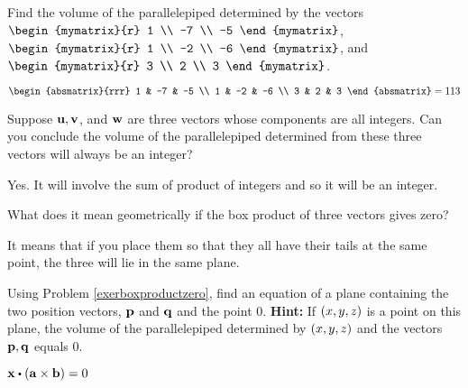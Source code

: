\begin{enumialphparenastyle}

\begin{ex} Find the volume of the parallelepiped determined by the vectors
$\begin{mymatrix}{r}
1 \\
-7 \\
-5
\end{mymatrix} $, \\
 $\begin{mymatrix}{r}
1 \\
-2 \\
-6
\end{mymatrix}$, and $\begin{mymatrix}{r}
3 \\
2 \\
3
\end{mymatrix}$.
\begin{sol}
 $\begin{absmatrix}{rrr}
1 & -7 & -5 \\
1 & -2 & -6 \\
3 & 2 & 3
\end{absmatrix}= 113$
\end{sol}
\end{ex}

\begin{ex} Suppose ${\bf u},{\bf v}$, and ${\bf w}$ are three vectors whose
components are all integers. Can you conclude the volume of the
parallelepiped determined from these three vectors will always be an integer?
\begin{sol}
Yes. It will involve the sum of product of integers and so it will
be an integer.
\end{sol}
\end{ex}

\begin{ex} \label{exerboxproductzero} What does it mean geometrically if the box
product of three vectors gives zero?
\begin{sol}
It means that if you place them so that
they all have their tails at the same point, the three will lie in the same
plane.
\end{sol}
\end{ex}

\begin{ex} Using Problem \ref{exerboxproductzero}, find an equation of a plane
containing the two position vectors, ${\bf p}$ and ${\bf q}$ and the
point $0$. 
\textbf{Hint: }If $\left(x,y,z\right) $ is a point on
this plane, the volume of the parallelepiped determined by $\left(
x,y,z\right) $ and the vectors ${\bf p},{\bf q}$ equals 0.
\begin{sol}
$\vect{x}\dotprod \tup{\vect{a}\times \vect{b}} =0$
\end{sol}
\end{ex}


\end{enumialphparenastyle}
